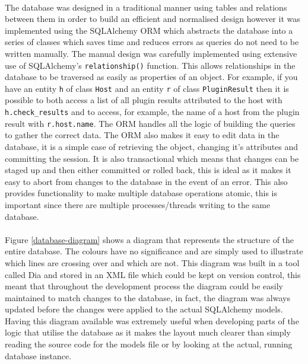 \documentclass[bsc,logo,twoside,singlespacing,notimes]{infthesis}
\begin{document}
\paragraph*{}
	The database was designed in a traditional manner using tables and relations
	between them in order to build an efficient and normalised design however it
	was implemented using the SQLAlchemy ORM which abstracts the database into a
	series of classes which saves time and reduces errors as queries do not need
	to be written manually.  The manual design was carefully implemented using
	extensive use of SQLAlchemy's \texttt{relationship()} function.  This allows
	relationships in the database to be traversed as easily as properties of an
	object.  For example, if you have an entity \texttt{h} of class \texttt{Host}
	and an entity \texttt{r} of class \texttt{PluginResult} then it is possible
	to both access a list of all plugin results attributed to the host with
	\texttt{h.check\_results} and to access, for example, the name of a host
	from the plugin result with \texttt{r.host.name}.  The ORM handles all the
	logic of building the queries to gather the correct data.  The ORM also makes
	it easy to edit data in the database, it is a simple case of retrieving the
	object, changing it's attributes and committing the session.  It is also
	transactional which means that changes can be staged up and then either
	committed or rolled back, this is ideal as it makes it easy to abort from
	changes to the database in the event of an error.  This also provides
	functionality to make multiple database operations atomic, this is important
	since there are multiple processes/threads writing to the same database.
	
\paragraph*{}
	Figure \ref{database-diagram} shows a diagram that represents the structure
	of the entire database.  The colours have no significance and are simply used
	to illustrate which lines are crossing over and which are not.
	This diagram was built in a tool called Dia and stored
	in an XML file which could be kept on version control, this meant that
	throughout the development process the diagram could be easily maintained to
	match changes to the database, in fact, the diagram was always updated before
	the changes were applied to the actual SQLAlchemy models. Having this diagram
	available was extremely useful when developing parts of the logic that utilise
	the database as it makes the layout much clearer than simply reading the source
	code for the models file or by looking at the actual, running database
	instance.
	
\end{document}
